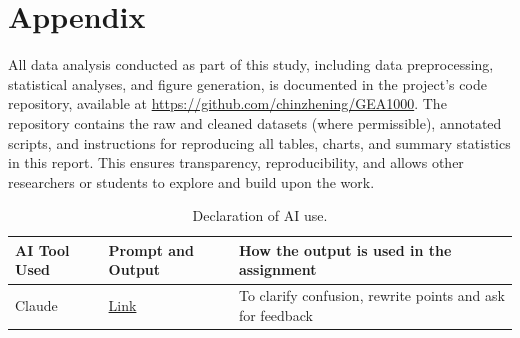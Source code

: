 \appendix
\section*{Appendix}

All data analysis conducted as part of this study, including data preprocessing, statistical analyses, and figure generation, is documented in the project’s code repository, available at \url{https://github.com/chinzhening/GEA1000}. The repository contains the raw and cleaned datasets (where permissible), annotated scripts, and instructions for reproducing all tables, charts, and summary statistics in this report. This ensures transparency, reproducibility, and allows other researchers or students to explore and build upon the work.



\begin{table}[h!]
\centering
\begin{tabular}{@{}p{3cm}p{5cm}p{6cm}@{}}
\toprule
\textbf{AI Tool Used} & \textbf{Prompt and Output} & \textbf{How the output is used in the assignment} \\
\midrule
Claude & \href{https://claude.ai/share/23655969-b9ae-4093-bdfc-f3e56e40c6ac}{Link} & To clarify confusion, rewrite points and ask for feedback \\
\bottomrule
\end{tabular}
\caption{Declaration of AI use.}
\label{tab:ai_declaration}
\end{table}